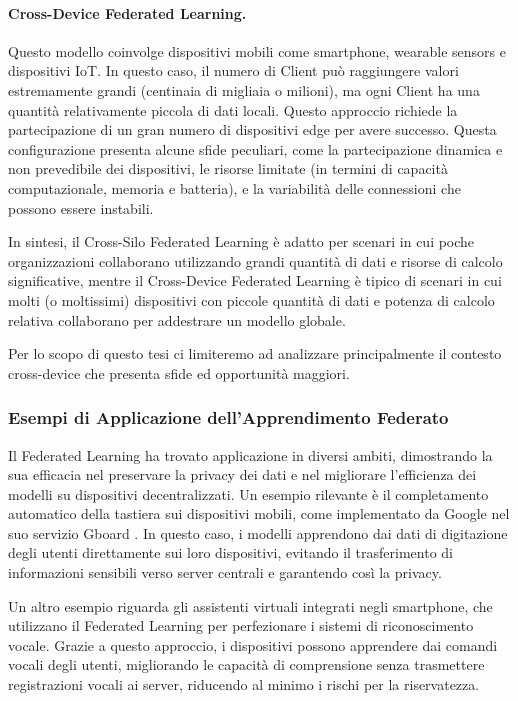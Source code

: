 \documentclass[a4paper, oneside, openright]{report}
\begin{document}
\paragraph{Cross-Device Federated Learning.} Questo modello coinvolge dispositivi mobili come smartphone, wearable sensors e dispositivi IoT. In questo caso, il numero di Client può raggiungere valori estremamente grandi (centinaia di migliaia o milioni), ma ogni Client ha una quantità relativamente piccola di dati locali. Questo approccio richiede la partecipazione di un gran numero di dispositivi edge per avere successo. Questa configurazione presenta alcune sfide peculiari, come la partecipazione dinamica e non prevedibile  dei dispositivi, le risorse limitate (in termini di capacità computazionale, memoria e batteria), e la variabilità delle connessioni che possono essere instabili.

In sintesi, il Cross-Silo Federated Learning è adatto per scenari in cui poche organizzazioni collaborano utilizzando grandi quantità di dati e risorse di calcolo significative, mentre il Cross-Device Federated Learning è tipico di scenari in cui molti (o moltissimi) dispositivi con piccole quantità di dati e potenza di calcolo relativa collaborano per addestrare un modello globale.

Per lo scopo di questo tesi ci limiteremo ad analizzare principalmente il contesto cross-device che presenta sfide ed opportunità maggiori.

\subsubsection*{Esempi di Applicazione dell'Apprendimento Federato}

Il Federated Learning ha trovato applicazione in diversi ambiti, dimostrando la sua efficacia nel preservare la privacy dei dati e nel migliorare l’efficienza dei modelli su dispositivi decentralizzati. Un esempio rilevante è il completamento automatico della tastiera sui dispositivi mobili, come implementato da Google nel suo servizio Gboard \cite{lian2017decentralizedalgorithmsoutperformcentralized}. In questo caso, i modelli apprendono dai dati di digitazione degli utenti direttamente sui loro dispositivi, evitando il trasferimento di informazioni sensibili verso server centrali e garantendo così la privacy.

Un altro esempio riguarda gli assistenti virtuali integrati negli smartphone, che utilizzano il Federated Learning per perfezionare i sistemi di riconoscimento vocale. Grazie a questo approccio, i dispositivi possono apprendere dai comandi vocali degli utenti, migliorando le capacità di comprensione senza trasmettere registrazioni vocali ai server, riducendo al minimo i rischi per la riservatezza.
\end{document}

